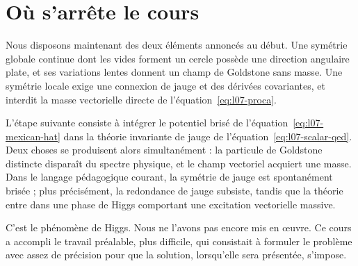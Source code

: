 \section{Où s’arrête le cours}

Nous disposons maintenant des deux éléments annoncés au début. Une symétrie globale continue dont les vides forment un cercle possède une direction angulaire plate, et ses variations lentes donnent un champ de Goldstone sans masse. Une symétrie locale exige une connexion de jauge et des dérivées covariantes, et interdit la masse vectorielle directe de l’équation~\eqref{eq:l07-proca}.

L’étape suivante consiste à intégrer le potentiel brisé de l’équation~\eqref{eq:l07-mexican-hat} dans la théorie invariante de jauge de l’équation~\eqref{eq:l07-scalar-qed}. Deux choses se produisent alors simultanément : la particule de Goldstone distincte disparaît du spectre physique, et le champ vectoriel acquiert une masse. Dans le langage pédagogique courant, la symétrie de jauge est spontanément brisée ; plus précisément, la redondance de jauge subsiste, tandis que la théorie entre dans une phase de Higgs comportant une excitation vectorielle massive.

C’est le phénomène de Higgs. Nous ne l’avons pas encore mis en œuvre. Ce cours a accompli le travail préalable, plus difficile, qui consistait à formuler le problème avec assez de précision pour que la solution, lorsqu’elle sera présentée, s’impose.